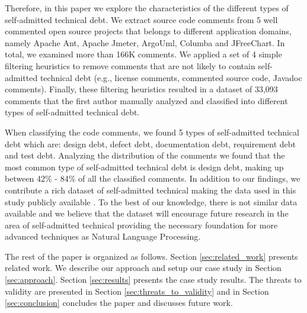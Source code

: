 
Therefore, in this paper we explore the characteristics of the different types of self-admitted technical debt. We extract source code comments from 5 well commented open source projects that belongs to different application domains, namely Apache Ant, Apache Jmeter, ArgoUml, Columba and JFreeChart. In total, we examined more than 166K comments. We applied a set of 4 simple filtering heuristics to remove comments that are not likely to contain self-admitted technical debt (e.g., license comments, commented source code, Javadoc comments). Finally, these filtering heuristics resulted in a dataset of 33,093 comments that the first author manually analyzed and classified into different types of self-admitted technical debt.

When classifying the code comments, we found 5 types of self-admitted technical debt which are: design debt, defect debt, documentation debt, requirement debt and test debt. Analyzing the distribution of the comments we found that the most common type of self-admitted technical debt is design debt, making up between 42\% - 84\% of all the classified comments. In addition to our findings, we contribute a rich dataset of self-admitted technical making the data used in this study publicly available . To the best of our knowledge, there is not similar data available and we believe that the dataset will encourage future research in the area of self-admitted technical providing the necessary foundation for more advanced techniques as Natural Language Processing.  


The rest of the paper is organized as follows. Section \ref{sec:related_work} presents related work. We describe our approach and setup our case study in Section \ref{sec:approach}. Section \ref{sec:results} presents the case study results. The threats to validity are presented in Section \ref{sec:threats_to_validity} and in Section \ref{sec:conclusion} concludes the paper and discusses future work. 